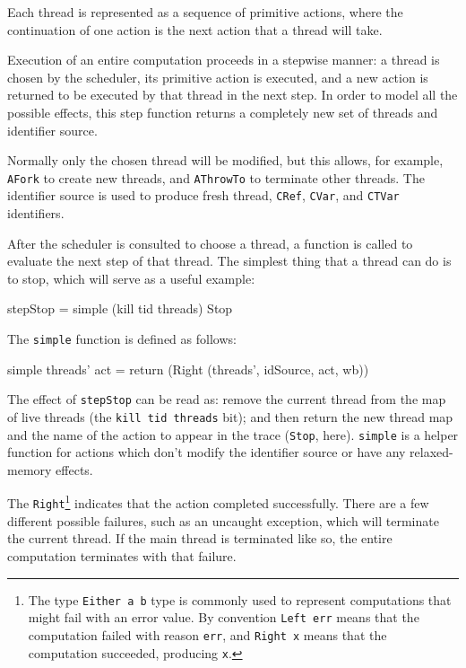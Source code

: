 Each thread is represented as a sequence of primitive actions, where
the continuation of one action is the next action that a thread will
take.

Execution of an entire computation proceeds in a stepwise manner: a
thread is chosen by the scheduler, its primitive action is executed,
and a new action is returned to be executed by that thread in the next
step. In order to model all the possible effects, this step function
returns a completely new set of threads and identifier source.

Normally only the chosen thread will be modified, but this allows, for
example, \verb|AFork| to create new threads, and \verb|AThrowTo| to
terminate other threads. The identifier source is used to produce
fresh thread, \verb|CRef|, \verb|CVar|, and \verb|CTVar| identifiers.

After the scheduler is consulted to choose a thread, a function is
called to evaluate the next step of that thread. The simplest thing
that a thread can do is to stop, which will serve as a useful
example:

\begin{haskellcode}
stepStop = simple (kill tid threads) Stop
\end{haskellcode}

The \verb|simple| function is defined as follows:

\begin{haskellcode}
simple threads' act = return (Right (threads', idSource, act, wb))
\end{haskellcode}

The effect of \verb|stepStop| can be read as: remove the current
thread from the map of live threads (the \verb|kill tid threads| bit);
and then return the new thread map and the name of the action to
appear in the trace (\verb|Stop|, here). \verb|simple| is a helper
function for actions which don't modify the identifier source or have
any relaxed-memory effects.

The \verb|Right|\footnote{The type \texttt{Either a b} type is
  commonly used to represent computations that might fail with an
  error value. By convention \texttt{Left err} means that the
  computation failed with reason \texttt{err}, and \texttt{Right x}
  means that the computation succeeded, producing \texttt{x}.}
indicates that the action completed successfully. There are a few
different possible failures, such as an uncaught exception, which will
terminate the current thread. If the main thread is terminated like
so, the entire computation terminates with that failure.

